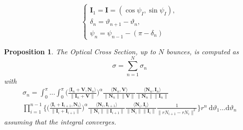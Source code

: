 \documentclass[11pt,reqno]{amsart}
\newtheorem{proposition}{Proposition}
\newcommand{\ip}[2]{\langle {#1}, {#2} \rangle}
\theoremstyle{definition}
\begin{document}
\begin{equation}\label{equ:induct}
\begin{cases}\mathbf{I}_1=\mathbf{I}=(\cos\psi_{I},\sin\psi_{I}),\\
\delta_n=\vartheta_{n+1}-\vartheta_n,\\
\psi_n=\psi_{n-1}-(\pi-\delta_n)\end{cases}
\tag{$\ast$}
\end{equation} 

\begin{proposition}
The Optical Cross Section, up to $N$ bounces, is computed as
\[
\sigma=\sum_{n=1}^{N}\sigma_n
\]
with
\begin{multline*}
\sigma_n =
\int_{0}^{\pi}...\int_{0}^{\pi}
\Bigg(\frac{\ip{\mathbf{I}_n+\mathbf{V}}{\mathbf{N}_n}}{\|\mathbf{I}_n+\mathbf{V}\|}\Bigg)^\alpha\frac{\ip{\mathbf{N}_n}{\mathbf{V}}}{\|\mathbf{N}_n\| \|\mathbf{V}\|}\frac{\ip{\mathbf{N}_n}{\mathbf{I}_n}}{\|\mathbf{N}_n\| \|\mathbf{I}_n\|} \\ 
\prod_{i=1}^{n-1}\bigg\{ \Bigg(\frac{\ip{\mathbf{I}_i+\mathbf{I}_{i+1}}{\mathbf{N}_i}}{\|\mathbf{I}_i+\mathbf{I}_{i+1}\|}\Bigg)^\alpha \frac{\ip{\mathbf{N}_i}{\mathbf{I}_{i+1}}}{\|\mathbf{N}_i\| \|\mathbf{I}_{i+1}\|}\frac{\ip{\mathbf{N}_i}{\mathbf{I}_i}}{\|\mathbf{N}_i\| \|\mathbf{I}_i\|}\frac{1}{\|rN_{i+1}-rN_i\|^2}\bigg\}r^n\: \mathrm{d}\vartheta_1...\mathrm{d}\vartheta_n\end{multline*}
assuming that the integral converges.
\end{proposition}
\end{document}
